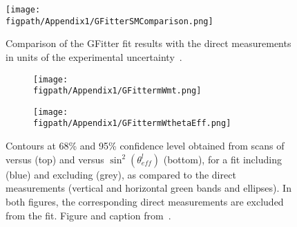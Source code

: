 \begin{figure}[!hbt]
    \centering
    \texttt{[image: \\figpath/Appendix1/GFitterSMComparison.png]}
    \caption{Comparison of the GFitter fit results with the direct measurements in units of the experimental uncertainty~\cite{Baak:2014ora}.}
    \label{fig:SMConsistency}
\end{figure}

\begin{figure}[!hbt]
    \centering
    \begin{subfigure}[t]{0.85\textwidth}
        \texttt{[image: \\figpath/Appendix1/GFittermWmt.png]}
        \caption{}
        \label{fig:mWmtGFitter}
    \end{subfigure}

    \begin{subfigure}[t]{0.85\textwidth}
        \texttt{[image: \\figpath/Appendix1/GFittermWthetaEff.png]}
        \caption{}
        \label{fig:mWthetaEffGFitter}
    \end{subfigure}
    \caption{Contours at 68\% and 95\% confidence level obtained from scans of \MW versus \Mt (top) and \MW versus $\sin^{2}\left(\theta_{eff}^{l}\right)$ (bottom), for a fit including \MH (blue) and excluding \MH (grey), as compared to the direct measurements (vertical and horizontal green bands and ellipses). In both figures, the corresponding direct measurements are excluded from the fit. Figure and caption from~\cite{Baak:2014ora}.}
    \label{fig:GFitterResults}
\end{figure}

